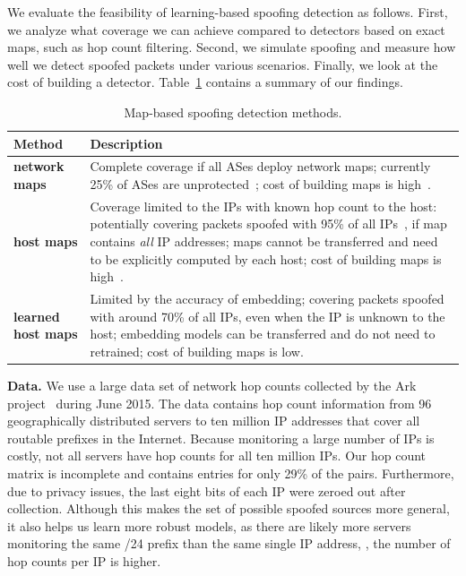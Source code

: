 We evaluate the feasibility of learning-based spoofing detection as follows. First, we analyze what coverage we can achieve compared to detectors based on exact maps, such as hop count filtering. Second, we simulate spoofing and measure how well we detect spoofed packets under various scenarios. Finally, we look at the cost of building a detector. Table~\ref{tab:spoofing} contains a summary of our findings.

\def\arraystretch{1.5}
\setlength{\tabcolsep}{5pt}
\begin{table}[t]
	\centering
	\begin{tabular}{m{.16\linewidth}|p{.75\linewidth}}
		{\bf Method} & {\bf Description}\\
		\hline
		{\bf network maps} &  Complete coverage if all ASes deploy network maps; currently 25\% of ASes are unprotected~\citep{spoofing-state}; cost of building maps is high~\citep{pam17-loops}.\\
		\hline
		{\bf host maps} & Coverage limited to the IPs with known hop count to the host: potentially covering packets spoofed with 95\% of all IPs~\citep{hcf}, if map contains {\em all} IP addresses; maps cannot be transferred and need to be explicitly computed by each host; cost of building maps is high~\citep{hcf,ark}.\\
		\hline
		{\bf learned host maps} & Limited by the accuracy of embedding; covering packets spoofed with around 70\% of all IPs, even when the IP is unknown to the host; embedding models can be transferred and do not need to retrained; cost of building maps is low.\\
	\end{tabular}
	\caption{Map-based spoofing detection methods.}
	\label{tab:spoofing}
\end{table}


{\bf Data.} We use a large data set of network hop counts collected by the Ark project~\citep{ark} during June 2015. The data contains hop count information from 96 geographically distributed servers to ten million IP addresses that cover all routable prefixes in the Internet. 
%
Because monitoring a large number of IPs is costly, not all servers have hop counts for all ten million IPs. Our hop count matrix is incomplete and contains entries for only 29\% of the pairs.
%
Furthermore, due to privacy issues, the last eight bits of each IP were zeroed out after collection. Although this makes the set of possible spoofed sources more general, it also helps us learn more robust models, as there are likely more servers monitoring the same /24 prefix than the same single IP address, \ie{}, the number of hop counts per IP is higher. 

